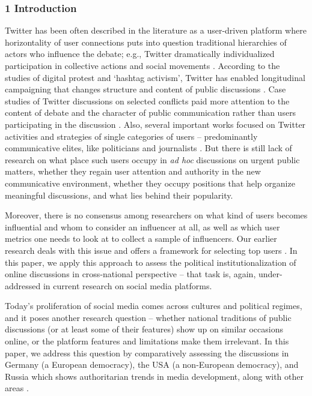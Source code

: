 \subsubsection{1 Introduction}

Twitter has been often described in the literature as a user-driven platform where horizontality of user connections puts into question traditional hierarchies of actors who influence the debate; e.g., Twitter dramatically individualized participation in collective actions and social movements \cite{BennettSegerberg,BastosMercea}. According to the studies of digital protest and ‘hashtag activism’, Twitter has enabled longitudinal campaigning that changes structure and content of public discussions \cite{BonillaRosa}. Case studies of Twitter discussions on selected conflicts paid more attention to the content of debate and the character of public communication rather than users participating in the discussion \cite{BonillaRosa,GroshekTandoc}. Also, several important works focused on Twitter activities and strategies of single categories of users -- predominantly communicative elites, like politicians and journalists \cite{BaumannFabianLessmann,LasorsaLewisHolton}. But there is still lack of research on what place such users occupy in \textit{ad hoc} discussions on urgent public matters, whether they regain user attention and authority in the new communicative environment, whether they occupy positions that help organize meaningful discussions, and what lies behind their popularity.

Moreover, there is no consensus among researchers on what kind of users becomes influential and whom to consider an influencer at all, as well as which user metrics one needs to look at to collect a sample of influencers. Our earlier research deals with this issue and offers a framework for selecting top users \cite{BodrunovaLitvinenkoNigmatullina,BodrunovaLitvinenkoBlekanov2016}. In this paper, we apply this approach to assess the political institutionalization of online discussions in cross-national perspective -- that task is, again, under-addressed in current research on social media platforms.

Today’s proliferation of social media comes across cultures and political regimes, and it poses another research question -- whether national traditions of public discussions (or at least some of their features) show up on similar occasions online, or the platform features and limitations make them irrelevant. In this paper, we address this question by comparatively assessing the discussions in Germany (a European democracy), the USA (a non-European democracy), and Russia which shows authoritarian trends in media development, along with other areas \cite{Toepfl2010,Sherstobitov,SmythOates,Denisova,BodrunovaLitvinenko}.


